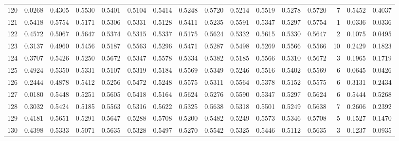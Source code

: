 \begin{tabular}{lrrrrrrrrrrrrrrr}
120 &      0.0268 &  0.4305 &  0.5530 &  0.5401 &  0.5104 &  0.5414 &  0.5248 &  0.5720 &  0.5214 &  0.5519 &   0.5278 &     0.5720 &      7 &                    0.5452 &                     0.4037 \\
121 &      0.5418 &  0.5754 &  0.5171 &  0.5306 &  0.5331 &  0.5128 &  0.5411 &  0.5235 &  0.5591 &  0.5347 &   0.5297 &     0.5754 &      1 &                    0.0336 &                     0.0336 \\
122 &      0.4572 &  0.5067 &  0.5647 &  0.5374 &  0.5315 &  0.5337 &  0.5175 &  0.5624 &  0.5332 &  0.5615 &   0.5330 &     0.5647 &      2 &                    0.1075 &                     0.0495 \\
123 &      0.3137 &  0.4960 &  0.5456 &  0.5187 &  0.5563 &  0.5296 &  0.5471 &  0.5287 &  0.5498 &  0.5269 &   0.5566 &     0.5566 &     10 &                    0.2429 &                     0.1823 \\
124 &      0.3707 &  0.5426 &  0.5250 &  0.5672 &  0.5347 &  0.5578 &  0.5334 &  0.5382 &  0.5185 &  0.5566 &   0.5310 &     0.5672 &      3 &                    0.1965 &                     0.1719 \\
125 &      0.4924 &  0.5350 &  0.5331 &  0.5107 &  0.5319 &  0.5184 &  0.5569 &  0.5349 &  0.5246 &  0.5516 &   0.5402 &     0.5569 &      6 &                    0.0645 &                     0.0426 \\
126 &      0.2444 &  0.4878 &  0.5412 &  0.5256 &  0.5472 &  0.5248 &  0.5575 &  0.5311 &  0.5564 &  0.5378 &   0.5152 &     0.5575 &      6 &                    0.3131 &                     0.2434 \\
127 &      0.0180 &  0.5448 &  0.5251 &  0.5605 &  0.5418 &  0.5164 &  0.5624 &  0.5276 &  0.5590 &  0.5347 &   0.5297 &     0.5624 &      6 &                    0.5444 &                     0.5268 \\
128 &      0.3032 &  0.5424 &  0.5185 &  0.5563 &  0.5316 &  0.5622 &  0.5325 &  0.5638 &  0.5318 &  0.5501 &   0.5249 &     0.5638 &      7 &                    0.2606 &                     0.2392 \\
129 &      0.4181 &  0.5651 &  0.5291 &  0.5647 &  0.5288 &  0.5708 &  0.5200 &  0.5482 &  0.5249 &  0.5573 &   0.5346 &     0.5708 &      5 &                    0.1527 &                     0.1470 \\
130 &      0.4398 &  0.5333 &  0.5071 &  0.5635 &  0.5328 &  0.5497 &  0.5270 &  0.5542 &  0.5325 &  0.5446 &   0.5112 &     0.5635 &      3 &                    0.1237 &                     0.0935 \\

\end{tabular}
